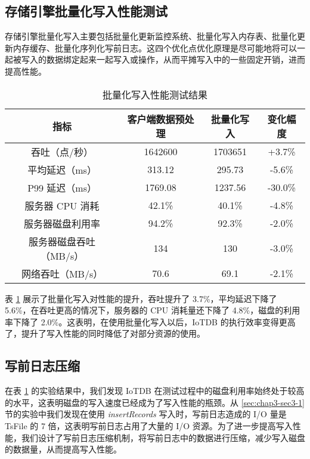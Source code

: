 \subsection{存储引擎批量化写入性能测试}
存储引擎批量化写入主要包括批量化更新监控系统、批量化写入内存表、批量化更新内存缓存、批量化序列化写前日志。这四个优化点优化原理是尽可能地将可以一起被写入的数据绑定起来一起写入或操作，从而平摊写入中的一些固定开销，进而提高性能。
\begin{table}
  \centering
  \caption{批量化写入性能测试结果}
  \begin{tabular}{cccc}
    \toprule 
    指标 & 客户端数据预处理 & 批量化写入 & 变化幅度 \\ 
    \midrule  
    吞吐（点/秒） & 1642600 & 1703651 & +3.7\%\\  
    平均延迟（ms） & 313.12 & 295.73 & -5.6\%\\  
    P99 延迟（ms） & 1769.08 & 1237.56 & -30.0\% \\  
    服务器 CPU 消耗 & 42.1\% & 40.1\% & -4.8\%\\  
    服务器磁盘利用率 & 94.2\% & 92.3\% & -2.0\%\\  
    服务器磁盘吞吐（MB/s） & 134 & 130 & -3.0\% \\  
    网络吞吐（MB/s） & 70.6 & 69.1 & -2.1\%\\  
    \bottomrule
  \end{tabular}
  \label{tabular:batch-write-performance}
\end{table}

表 \ref{tabular:batch-write-performance} 展示了批量化写入对性能的提升，吞吐提升了 3.7\%，平均延迟下降了 5.6\%，在吞吐更高的情况下，服务器的 CPU 消耗量还下降了 4.8\%，磁盘的利用率下降了 2.0\%。这表明，在使用批量化写入以后，IoTDB 的执行效率变得更高了，提升了写入性能的同时降低了对部分资源的使用。

\subsection{写前日志压缩}
在表 \ref{tabular:batch-write-performance} 的实验结果中，我们发现 IoTDB 在测试过程中的磁盘利用率始终处于较高的水平，这表明磁盘的写入速度已经成为了写入性能的瓶颈。从 \ref{sec:chap3-sec3-1} 节的实验中我们发现在使用 \emph{insertRecords} 写入时，写前日志造成的 I/O 量是 TsFile 的 7 倍，这表明写前日志占用了大量的 I/O 资源。为了进一步提高写入性能，我们设计了写前日志压缩机制，将写前日志中的数据进行压缩，减少写入磁盘的数据量，从而提高写入性能。

